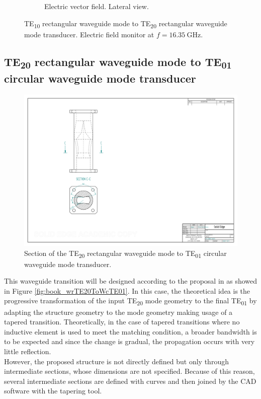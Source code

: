 \documentclass[english,twoside]{article}
\begin{document}
\begin{landscape}
\begin{figure}
\begin{subfigure}[b]{.6\textwidth}
					\caption{Electric vector field. Lateral view.}
				\end{subfigure}
				\caption{TE\textsubscript{10} rectangular waveguide mode to TE\textsubscript{20} rectangular waveguide mode transducer. Electric field monitor at $f=\SI{16.35}{\giga\hertz}$.}
				\label{fig:wrToWrTE20_abs}
			\end{figure}
		\end{landscape}
	
	\newpage
	\subsection{TE\textsubscript{20} rectangular waveguide mode to TE\textsubscript{01} circular waveguide mode transducer}
	 \begin{figure}
		\centering
		\includegraphics[width=.3\textwidth]{figures/wrTE20ToWcTE01_section}
		\caption{Section of the TE\textsubscript{20} rectangular waveguide mode to TE\textsubscript{01} circular waveguide mode transducer.}
		\label{fig:wrTE20ToWcTE01_section}
	\end{figure}
	
    This waveguide transition will be designed according to the proposal in \cite{montgomery} as showed in Figure \ref{fig:book_wrTE20ToWcTE01}. In this case, the theoretical idea is the progressive transformation of the input \ac{TE}\textsubscript{20} mode geometry to the final \ac{TE}\textsubscript{01} by adapting the structure geometry to the mode geometry making usage of a tapered transition. Theoretically, in the case of tapered transitions where no inductive element is used to meet the matching condition, a broader bandwidth is to be expected and since the change is gradual, the propagation occurs with very little reflection.\\
    
   
    
    However, the proposed structure is not directly defined but only through intermediate sections, whose dimensions are not specified. Because of this reason, several intermediate sections are defined with curves and then joined by the CAD software with the tapering tool.\\
    
\end{document}
